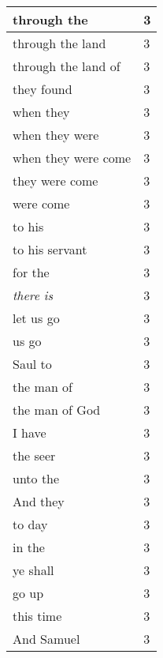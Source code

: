 \begin{center}
\begin{longtable}{|p{3.0in}|p{0.5in}|}
through the & 3\\ \hline 
through the land & 3\\ \hline 
through the land of & 3\\ \hline 
they found & 3\\ \hline 
when they & 3\\ \hline 
when they were & 3\\ \hline 
when they were come & 3\\ \hline 
they were come & 3\\ \hline 
were come & 3\\ \hline 
to his & 3\\ \hline 
to his servant & 3\\ \hline 
for the & 3\\ \hline 
\emph{there} \emph{is} & 3\\ \hline 
let us go & 3\\ \hline 
us go & 3\\ \hline 
Saul to & 3\\ \hline 
the man of & 3\\ \hline 
the man of God & 3\\ \hline 
I have & 3\\ \hline 
the seer & 3\\ \hline 
unto the & 3\\ \hline 
And they & 3\\ \hline 
to day & 3\\ \hline 
in the & 3\\ \hline 
ye shall & 3\\ \hline 
go up & 3\\ \hline 
this time & 3\\ \hline 
And Samuel & 3\\ \hline 
\end{longtable}
\end{center}





